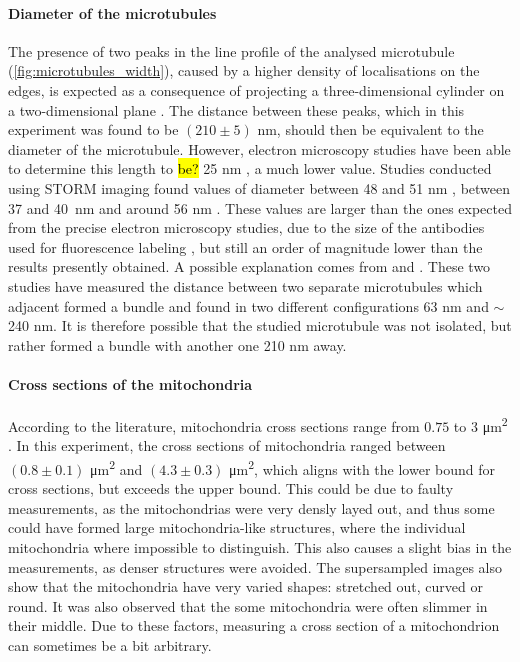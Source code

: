 \paragraph{Diameter of the microtubules}
The presence of two peaks in the line profile of the analysed microtubule (\autoref{fig:microtubules_width}), caused by a higher density of localisations on the edges, is expected as a consequence of projecting a three-dimensional cylinder on a two-dimensional plane \cite{douglass_notice_2023}.
The distance between these peaks, which in this experiment was found to be $(210 \pm 5)$ nm, should then be equivalent to the diameter of the microtubule.
However, electron microscopy studies have been able to determine this length to \hl{be?} 25 nm \cite{moores_electron_2008}, a much lower value.
Studies conducted using STORM imaging found values of diameter between 48 and 51 nm \cite{bharadwaj_advancing_2024}, between 37 and \mbox{40 nm} \cite{douglass_super-resolution_2016} and around 56 nm \cite{bates_multicolor_2007}.
These values are larger than the ones expected from the precise electron microscopy studies, due to the size of the antibodies used for fluorescence labeling \cite{douglass_notice_2023}, but still an order of magnitude lower than the results presently obtained.
A possible explanation comes from \cite{dong_stochastic_2015} and \cite{wang_blind_2017}.
These two studies have measured the distance between two separate microtubules which adjacent formed a bundle and found in two different configurations 63 nm and $\sim$240 nm.
It is therefore possible that the studied microtubule  was not isolated, but rather formed a bundle with another one 210 nm away.

\paragraph{Cross sections of the mitochondria}
According to the literature, mitochondria cross sections range from $0.75$ to $3$ \si{\micro\meter\squared} \cite{wiemerslage_quantification_2016}. In this experiment, the cross sections of mitochondria ranged between $(0.8 \pm 0.1)$ \unit{\micro\meter\squared} and $(4.3 \pm 0.3)$ \unit{\micro\meter\squared}, which aligns with the lower bound for cross sections, but exceeds the upper bound. This could be due to faulty measurements, as the mitochondrias were very densly layed out, and thus some could have formed large mitochondria-like structures, where the individual mitochondria where impossible to distinguish. This also causes a slight bias in the measurements, as denser structures were avoided. The supersampled images also show that the mitochondria have very varied shapes: stretched out, curved or round. It was also observed that the some mitochondria were often slimmer in their middle. Due to these factors, measuring a cross section of a mitochondrion can sometimes be a bit arbitrary.

